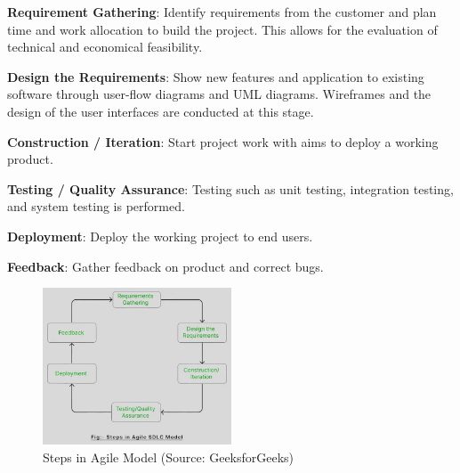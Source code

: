 \documentclass[12pt, a4paper]{article}
\begin{document}
\textbf{Requirement Gathering}: Identify requirements from the customer and plan time and work allocation to build the project. This allows for the evaluation of technical and economical feasibility.

\textbf{Design the Requirements}: Show new features and application to existing software through user-flow diagrams and UML diagrams. Wireframes and the design of the user interfaces are conducted at this stage.

\textbf{Construction / Iteration}: Start project work with aims to deploy a working product.

\textbf{Testing / Quality Assurance}: Testing such as unit testing, integration testing, and system testing is performed.

\textbf{Deployment}: Deploy the working project to end users.

\textbf{Feedback}: Gather feedback on product and correct bugs.


\begin{figure}[h]
    \centering
    \includegraphics[width=0.5\textwidth]{images/agile-model.jpg}
    \caption{Steps in Agile Model (Source: GeeksforGeeks)}
    \label{fig:Agile}
\end{figure}
\end{document}
